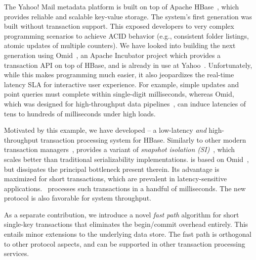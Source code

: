 The Yahoo! Mail metadata platform is built on top of Apache HBase~\cite{hbase}, 
which provides reliable and scalable key-value storage. The system's first generation
was built without transaction support. This exposed  developers to very complex programming scenarios 
to achieve ACID behavior (e.g., consistent folder listings, atomic updates of multiple counters). 
We have looked into building the next generation using  Omid~\cite{omid}, 
an Apache Incubator project which provides a transaction API on top of HBase, and 
 is already in use at Yahoo~\cite{Omid2017}.
Unfortunately, while this makes programming much easier, it also jeopardizes 
the real-time latency SLA for interactive user experience. For example,  
simple updates and point queries must complete within single-digit milliseconds, 
whereas Omid, which was designed for high-throughput data pipelines~\cite{Omid2017}, 
can induce latencies of tens to hundreds of milliseconds under high loads. 

Motivated by this example, we have developed {\sys\/} -- a low-latency {\em and\/} high-throughput 
transaction processing system for HBase. Similarly to other modern transaction 
managers~\cite{Percolator2010,Spanner2012,Omid2017,cockroach},
{\sys\/} provides a variant of \emph{snapshot isolation (SI)}~\cite{DBLP:conf/sigmod/BerensonBGMOO95},
which scales better than traditional serializability implementations. {\sys\/} is based on Omid~\cite{omid}, 
but dissipates the principal bottleneck present therein.
Its advantage is maximized for short  transactions, which are prevalent in latency-sensitive applications.
\sys\ processes  such transactions in a handful of milliseconds. The new protocol is also favorable for system throughput. 

As a separate contribution, we introduce a novel {\em fast path\/} algorithm for short single-key transactions 
that eliminates the begin/commit overhead entirely. 
This entails minor extensions to the underlying 
data store. The fast path is orthogonal to other protocol aspects, and can be  supported in other 
transaction processing services.


